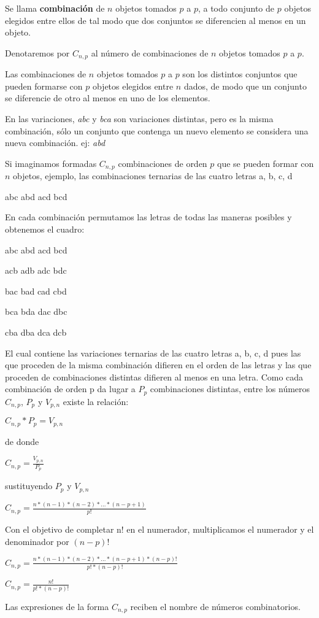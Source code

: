 Se llama {\bf combinación} de $n$ objetos tomados $p$ a $p$, a todo conjunto de $p$ objetos
elegidos entre ellos de tal modo que dos conjuntos se diferencien al menos en un
objeto.

Denotaremos por $C_{n,p}$  al número de combinaciones de $n$ objetos tomados $p$ a $p$.

Las combinaciones de $n$ objetos tomados $p$ a $p$ son los distintos conjuntos que pueden
formarse con $p$ objetos elegidos entre $n$ dados, de modo que un conjunto se diferencie
de otro al menos en uno de los elementos.

En las variaciones, \emph{abc} y \emph{bca} son variaciones distintas, pero es la misma
combinación, sólo un conjunto que contenga un nuevo elemento se considera una nueva
combinación. ej: \emph{abd}

Si imaginamos formadas $C_{n,p}$ combinaciones de orden $p$ que se pueden formar con $n$
objetos, ejemplo, las combinaciones ternarias de las cuatro letras a, b, c, d

abc abd acd bcd

En cada combinación permutamos las letras de todas las maneras posibles y obtenemos
el cuadro:

abc abd acd bcd

acb adb adc bdc

bac bad cad cbd

bca bda dac dbc

cba dba dca dcb

El cual contiene las variaciones ternarias de las cuatro letras a, b, c, d pues las
que proceden de la misma combinación difieren en el orden de las letras y las que
proceden de combinaciones distintas difieren al menos en una letra. Como cada
combinación de orden p da lugar a $P_{p}$ combinaciones distintas, entre los números
$C_{n,p}$, $P_{p}$ y $V_{p,n}$ existe la relación:

$C_{n,p}*P_{p}=V_{p,n}$ 

de donde 

$C_{n,p}=\frac{V_{p,n}}{P_{p}}$

sustituyendo $P_{p}$ y $V_{p,n}$

$C_{n,p}=\frac{n*(n-1)*(n-2)* ... *(n-p+1)}{p!}$

Con el objetivo de completar n! en el numerador, multiplicamos el numerador y el
denominador por $(n-p)!$

$C_{n,p}=\frac{n*(n-1)*(n-2)* ... *(n-p+1)*(n-p)!}{p!*(n-p)!}$

$C_{n,p}=\frac{n!}{p!*(n-p)!}$

Las expresiones de la forma $C_{n,p}$ reciben el nombre de números combinatorios.


